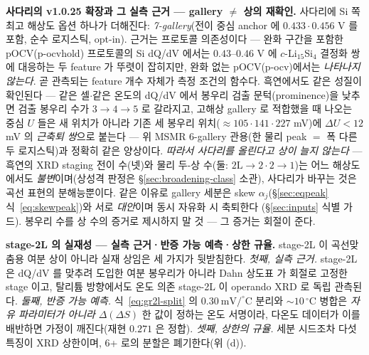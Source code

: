 \textbf{사다리의 v1.0.25 확장과 그 실측 근거 --- gallery $\ne$ 상의 재확인.} 사다리에 Si 쪽 최고 해상도 옵션
하나가 더해진다: \emph{7-gallery}(전이 중심 anchor 에 $0.433\cdot0.456$ V 를 포함, 순수 로지스틱, opt-in).
근거는 프로토콜 의존성이다 --- 완화 구간을 포함한 pOCV(p-ocvhold) 프로토콜의 Si dQ/dV 에서는 $0.43$--$0.46$ V
에 $c$-Li$_{15}$Si$_4$ 결정화 쌍에 대응하는 두 feature 가 뚜렷이 잡히지만, 완화 없는 pOCV(p-ocv)에서는
\emph{나타나지 않는다}. 곧 관측되는 feature 개수 자체가 측정 조건의 함수다. 흑연에서도 같은 성질이 확인된다 ---
같은 셀$\cdot$같은 온도의 dQ/dV 에서 봉우리 검출 문턱(prominence)을 낮추면 검출 봉우리 수가 $3\to4\to5$ 로
갈라지고, 고해상 gallery 로 적합했을 때 나오는 중심 $U$ 들은 새 위치가 아니라 기존 세 봉우리
위치($\approx105\cdot141\cdot227$ mV)에 $\Delta U<12$ mV 의 \emph{근축퇴 쌍}으로 붙는다 --- 위 MSMR
6-gallery 관용\cite{verbrugge2017}(한 물리 peak $=$ 폭 다른 두 로지스틱)과 정확히 같은 양상이다.
\emph{따라서 사다리를 올린다고 상이 늘지 않는다} --- 흑연의 XRD staging 전이 수(넷)와 물리 두-상
수(둘: $2\mathrm L\!\to\!2\cdot2\!\to\!1$)는 어느 해상도에서도 \emph{불변}이며(상성격 판정은
\S\ref{sec:broadening-class} 소관), 사다리가 바꾸는 것은 곡선 표현의 분해능뿐이다. 같은 이유로 gallery 세분은
skew $\alpha_j$(\S\ref{sec:eqpeak} 식~\eqref{eq:skewpeak})와 서로 \emph{대안}이며 동시 자유화 시 축퇴한다
(\S\ref{sec:inputs} 식별 가드). 봉우리 수를 상 수의 증거로 제시하지 말 것 --- 그 증거는 회절이 준다.

\medskip
\textbf{stage-2L 의 실재성 --- 실측 근거·반증 가능 예측·상한 규율.} stage-2L 이 곡선맞춤용 여분 상이 아니라 실재 상임은 세 가지가 뒷받침한다. \emph{첫째, 실측 근거.}
stage-2L 은 dQ/dV 를 맞추려 도입한 여분 봉우리가 아니라 Dahn 상도표\cite{dahn1991} 가 회절로 고정한 stage
이고, 탈리튬 방향에서도 온도 의존 stage-2L 이 operando XRD 로 독립 관측된다\cite{schmitt2022}. \emph{둘째,
반증 가능 예측.} 식~\eqref{eq:gr2l-split} 의 $0.30\ \mathrm{mV/^\circ C}$ 분리와 $\sim10\,^\circ$C 병합은
\emph{자유 파라미터가 아니라} $\Delta(\Delta S)$ 한 값이 정하는 온도 서명이라, 다온도 데이터가 이를 배반하면
가정이 깨진다(재현 $0.271$ 은 정합). \emph{셋째, 상한의 규율.} 세분 시드조차 다섯 특징이 XRD 상한이며, 6+ 로의
분할은 폐기한다(위 (d)).

